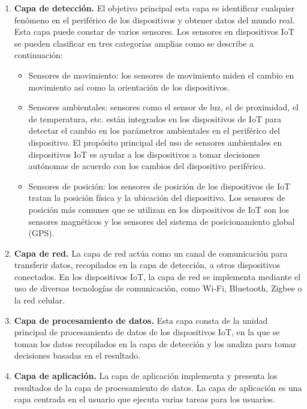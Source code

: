 	\begin{enumerate}
		\item \textbf{Capa de detección.} El objetivo principal esta capa es identificar cualquier fenómeno en el periférico de los dispositivos y obtener datos del mundo real. Esta capa puede constar de varios sensores. Los sensores en dispositivos IoT se pueden clasificar en tres categorías amplias como se describe a continuación: 
		
		\begin{itemize}
			\item Sensores de movimiento: los sensores de movimiento miden el cambio en movimiento así como la orientación de los dispositivos.
			
			\item Sensores ambientales: sensores como el sensor de luz, el de proximidad, el de temperatura, etc. están integrados en los dispositivos de IoT para detectar el cambio en los parámetros ambientales en el periférico del dispositivo. 			
			El propósito principal del uso de sensores ambientales en dispositivos IoT es ayudar a los dispositivos a tomar decisiones autónomas de acuerdo con los cambios del dispositivo periférico. 
			
			\item Sensores de posición: los sensores de posición de los dispositivos de IoT tratan la posición física y la ubicación del dispositivo. Los sensores de posición más comunes que se utilizan en los dispositivos de IoT son los sensores magnéticos y los sensores del sistema de posicionamiento global (GPS).
		\end{itemize}
	
		\item \textbf{Capa de red.} La capa de red actúa como un canal de comunicación para transferir datos, recopilados en la capa de detección, a otros dispositivos conectados. En los dispositivos IoT, la capa de red se implementa mediante el uso de diversas tecnologías de comunicación, como Wi-Fi, Bluetooth, Zigbee o la red celular.
		
		\item \textbf{Capa de procesamiento de datos.} Esta capa consta de la unidad principal de procesamiento de datos de los dispositivos IoT, en la que se toman los datos recopilados en la capa de detección y los analiza para tomar decisiones basadas en el resultado.
		
		\item \textbf{Capa de aplicación.} La capa de aplicación implementa y presenta los resultados de la capa de procesamiento de datos. La capa de aplicación es una capa centrada en el usuario que ejecuta varias tareas para los usuarios.
	\end{enumerate}
	